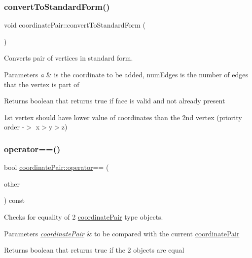 \subsubsection{\texorpdfstring{convert\+To\+Standard\+Form()}{convertToStandardForm()}}
{\footnotesize\ttfamily void coordinate\+Pair\+::convert\+To\+Standard\+Form (\begin{DoxyParamCaption}{ }\end{DoxyParamCaption})}



Converts pair of vertices in standard form. 


\begin{DoxyParams}{Parameters}
{\em a} & is the coordinate to be added, num\+Edges is the number of edges that the vertex is part of \\
\hline
\end{DoxyParams}
\begin{DoxyReturn}{Returns}
boolean that returns true if face is valid and not already present
\end{DoxyReturn}
1st vertex should have lower value of coordinates than the 2nd vertex (priority order -\/$>$ x$>$y$>$z) \mbox{\label{structcoordinate_pair_accc2a54a4dd8c6fd10be4b384cc912a3}} 
\subsubsection{\texorpdfstring{operator==()}{operator==()}}
{\footnotesize\ttfamily bool \mbox{\hyperlink{objects_8h_afc5adb2920a8566a6c3f0402a87d1027}{coordinate\+Pair\+::operator}}== (\begin{DoxyParamCaption}\item[{const \mbox{\hyperlink{structcoordinate_pair}{coordinate\+Pair}} \&}]{other }\end{DoxyParamCaption}) const\hspace{0.3cm}{\ttfamily [inline]}}



Checks for equality of 2 \mbox{\hyperlink{structcoordinate_pair}{coordinate\+Pair}} type objects. 


\begin{DoxyParams}{Parameters}
{\em \mbox{\hyperlink{structcoordinate_pair}{coordinate\+Pair}}} & to be compared with the current \mbox{\hyperlink{structcoordinate_pair}{coordinate\+Pair}} \\
\hline
\end{DoxyParams}
\begin{DoxyReturn}{Returns}
boolean that returns true if the 2 objects are equal 
\end{DoxyReturn}


